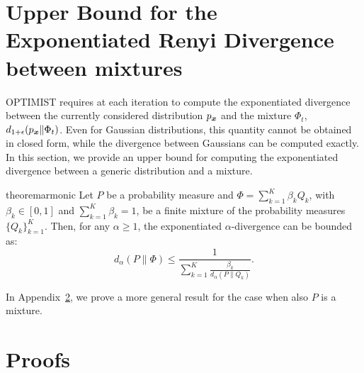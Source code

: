 \documentclass{article}
\makeatletter
\DeclareRobustCommand{\algoname}{OPTIMIST\@\xspace}
\makeatother
\begin{document}
\section{Upper Bound for the Exponentiated Renyi Divergence between mixtures}\label{app:practical}
\algoname requires at each iteration to compute the exponentiated \Renyi divergence between the currently considered distribution $p_{\boldsymbol{x}}$ 
and the mixture $\Phi_t$, \ie $d_{1+\epsilon}(p_{\boldsymbol{x}}\|\Phi_t)$. Even for Gaussian distributions, this quantity cannot be obtained in closed form, while
the \Renyi divergence between Gaussians can be computed exactly. In this section, we provide an upper bound for computing the exponentiated \Renyi divergence
between a generic distribution and a mixture.
\begin{restatable}{theorem}{armonic}\label{th:armonic}
	Let $P$ be a probability measure and $\Phi = \sum_{k=1}^K \beta_k Q_k$, with $\beta_k \in [0,1]$ and $\sum_{k=1}^K \beta_k =1$, be a finite mixture of the
	probability measures $\{Q_k\}_{k=1}^K$. Then, for any $\alpha \ge 1$, the exponentiated $\alpha$-\Renyi divergence can be bounded as: 
	\begin{equation*}
	d_{\alpha}(P \| \Phi) \le \frac{1} {\sum_{k=1}^K \frac{ \beta_k}{ d_{\alpha}(P \| Q_k)}}.
	\end{equation*}
\end{restatable}

In Appendix~\ref{app:proof}, we prove a more general result for the case when also $P$ is a mixture.

\section{Proofs}\label{app:proof}
\end{document}
